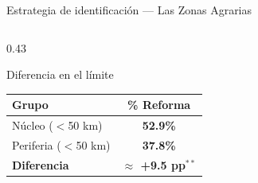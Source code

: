 \documentclass[aspectratio=169,t]{beamer}
\newcommand{\hl}[1]{\textcolor{azulmedio}{\textbf{#1}}}
\begin{document}
\begin{frame}{Estrategia de identificaci\'on --- Las Zonas Agrarias}
\begin{columns}[T]
\begin{column}{0.43\textwidth}
\begin{block}{\small Diferencia en el l\'imite}
\begin{tabular}{lc}
      \toprule
      \rowcolor{azuloscuro}
      \color{white}Grupo &
      \color{white}\% Reforma \\
      \midrule
      \rowcolor{azulclaro!60}
      N\'ucleo ($<$50 km) & \textbf{52.9\%}\\
      Periferia ($<$50 km) & \textbf{37.8\%}\\
      \midrule
      \rowcolor{azulclaro!30}
      \hl{Diferencia} &
      \hl{$\approx$ +9.5 pp$^{**}$}\\
      \bottomrule
    \end{tabular}
    \end{block}
  \end{column}
\end{columns}
\end{frame}

\end{document}
